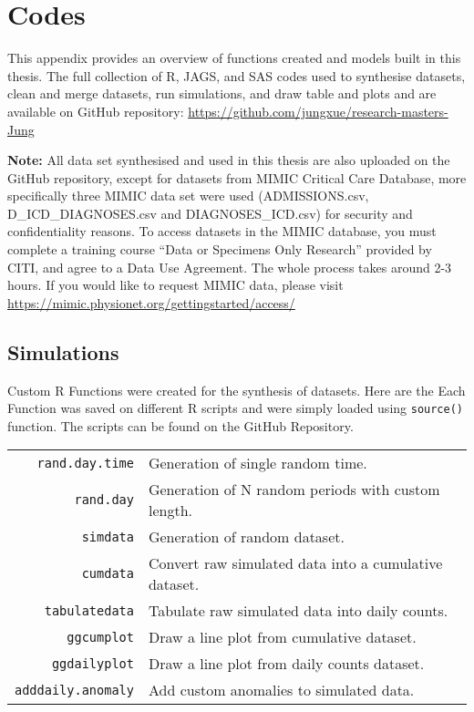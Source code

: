 \chapter{Codes}

This appendix provides an overview of functions created and models built in this thesis. The full collection of R, JAGS, and SAS codes used to synthesise datasets, clean and merge datasets, run simulations, and draw table and plots and are available on GitHub repository: \href{https://github.com/jungxue/research-masters-Jung}{https://github.com/jungxue/research-masters-Jung}

\newpara 

\textbf{Note:} All data set synthesised and used in this thesis are also uploaded on the GitHub repository, except for datasets from MIMIC Critical Care Database, more specifically three MIMIC data set were used (ADMISSIONS.csv, D\_ICD\_DIAGNOSES.csv and DIAGNOSES\_ICD.csv) for security and confidentiality reasons. To access datasets in the MIMIC database, you must complete a training course “Data or Specimens Only Research” provided by CITI, and agree to a Data Use Agreement. The whole process takes around 2-3 hours. If you would like to request MIMIC data, please visit \href{https://mimic.physionet.org/gettingstarted/access/}{https://mimic.physionet.org/gettingstarted/access/}


\section{Simulations}\label{Rfun}

Custom R Functions were created for the synthesis of datasets. Here are the  Each Function was saved on different R scripts and were simply loaded using \texttt{source()} function. The scripts can be found on the GitHub Repository. 

\newpara

\begin{tabular}{rl}
	\texttt{rand.day.time}   & Generation of single random time.\\
	\texttt{rand.day}        & Generation of N random periods with custom length.\\
	\texttt{simdata}         & Generation of random dataset.\\
	\texttt{cumdata}         & Convert raw simulated data into a cumulative dataset.\\
	\texttt{tabulatedata}    & Tabulate raw simulated data into daily counts.\\
	\texttt{ggcumplot}       & Draw a line plot from cumulative dataset.\\
	\texttt{ggdailyplot}     & Draw a line plot from daily counts dataset.\\
	\texttt{adddaily.anomaly}& Add custom anomalies to simulated data.\\
\end{tabular}

